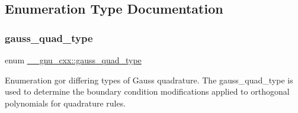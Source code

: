 \subsection{Enumeration Type Documentation}
\mbox{\label{namespace____gnu__cxx_a2ed4d746fa11452ef08bae893e031cb3}} 
\subsubsection{\texorpdfstring{gauss\+\_\+quad\+\_\+type}{gauss\_quad\_type}}
{\footnotesize\ttfamily enum \hyperlink{namespace____gnu__cxx_a2ed4d746fa11452ef08bae893e031cb3}{\+\_\+\+\_\+gnu\+\_\+cxx\+::gauss\+\_\+quad\+\_\+type}}



Enumeration gor differing types of Gauss quadrature. The gauss\+\_\+quad\+\_\+type is used to determine the boundary condition modifications applied to orthogonal polynomials for quadrature rules. 

